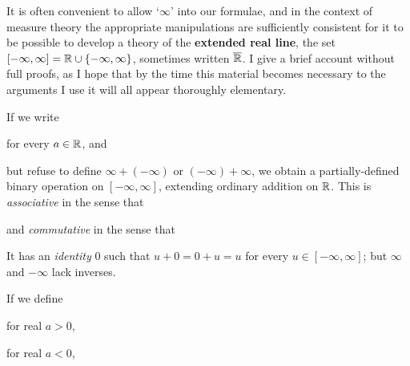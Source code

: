 
\def\chaptername{Complements}
\def\sectionname{The extended real line}


It is often convenient to allow
`$\infty$' into our formulae, and in the context of measure theory the
appropriate manipulations are sufficiently consistent for it to
be possible to develop a theory of the {\bf extended real line}, the set
$[-\infty,\infty]=\Bbb R\cup\{-\infty,\infty\}$, sometimes written
$\overline{\Bbb R}$.   I give a brief account without full proofs, as I
hope that by the time this material becomes necessary to the arguments I
use it will all appear thoroughly elementary.

 If we
write


\noindent for every $a\in\Bbb R$, and

\Centerline{$\infty+\infty=\infty$,\quad$(-\infty)+(-\infty)=-\infty$,}

\noindent but refuse to define $\infty+(-\infty)$ or $(-\infty)+\infty$,
we obtain a partially-defined binary operation on $[-\infty,\infty]$,
extending ordinary addition on $\Bbb R$.   This is {\it associative} in
the sense that


\noindent and {\it commutative} in the sense that


\noindent It has an {\it identity} $0$ such that $u+0=0+u=u$ for every
$u\in[-\infty,\infty]$;  but $\infty$ and $-\infty$ lack inverses.

 If we define


\noindent for real $a>0$,


\noindent for real $a<0$,

